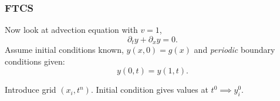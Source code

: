 \documentclass{beamer}
\begin{document}
\begin{frame}
  \frametitle{FTCS}

  \begin{overlayarea}{\textwidth}{0.8\textheight}
    {
      Now look at advection equation with $v=1$,
      \begin{equation*}
        \partial_{t} y + \partial_{x} y = 0.
      \end{equation*}
    }
    {
      Assume initial conditions known, $y(x, 0) = g(x)$
      and \emph{periodic} boundary conditions given:
      \begin{equation*}
        y(0, t) = y(1, t).
      \end{equation*}
    }
    {

      Introduce grid $(x_i, t^n)$. Initial condition gives values at
      $t^0 \implies y_i^0$.
    }
    {

      \vspace{1ex}

}
\end{overlayarea}
\end{frame}
\end{document}
